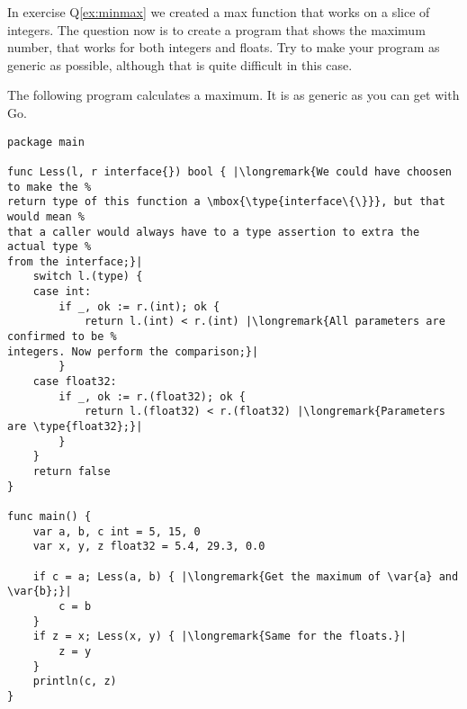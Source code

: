 \begin{Exercise}[title={Interfaces and max()},difficulty=7]
\Question
In exercise Q\ref{ex:minmax} we created a max function that works on
a slice of integers.
The question now is to create
a program that shows the maximum number, that works for both integers and floats.
Try to make your program as generic as possible, although that is quite difficult in
this case.
\end{Exercise}

\begin{Answer}
\Question
The following program calculates a maximum. It is as generic as you can get
with Go.

\begin{lstlisting}[caption=Generic way of calculating a maximum]
package main

func Less(l, r interface{}) bool { |\longremark{We could have choosen to make the %
return type of this function a \mbox{\type{interface\{\}}}, but that would mean %
that a caller would always have to a type assertion to extra the actual type %
from the interface;}|
	switch l.(type) {
	case int:
		if _, ok := r.(int); ok {
			return l.(int) < r.(int) |\longremark{All parameters are confirmed to be %
integers. Now perform the comparison;}|
		}
	case float32:
		if _, ok := r.(float32); ok {
			return l.(float32) < r.(float32) |\longremark{Parameters are \type{float32};}|
		}
	}
	return false
}

func main() {
	var a, b, c int = 5, 15, 0
	var x, y, z float32 = 5.4, 29.3, 0.0

	if c = a; Less(a, b) { |\longremark{Get the maximum of \var{a} and \var{b};}|
		c = b
	}
	if z = x; Less(x, y) { |\longremark{Same for the floats.}|
		z = y
	}
	println(c, z)
}
\end{lstlisting}
\showremarks
\end{Answer}
